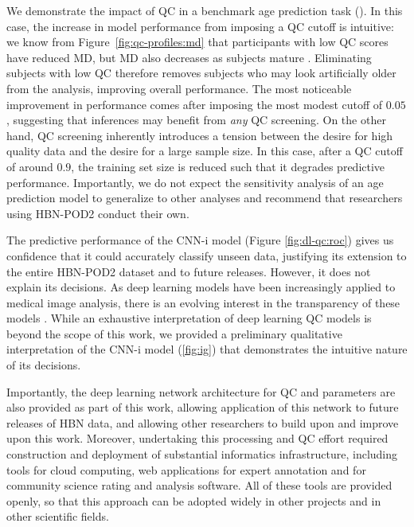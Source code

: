 \documentclass[fleqn,10pt]{wlscirep}
\begin{document}
We demonstrate the impact of QC in a benchmark age prediction task
(\label{fig:age-prediction}). In this case, the increase in model performance
from imposing a QC cutoff is intuitive: we know from
Figure~\ref{fig:qc-profiles:md} that participants with low QC scores have
reduced MD, but MD also decreases as subjects mature
\cite{yeatman2014lifespan,richie-halford2021multidimensional}. Eliminating
subjects with low QC therefore removes subjects who may look artificially older
from the analysis, improving overall performance. The most noticeable
improvement in performance comes after imposing the most modest cutoff of
$0.05$, suggesting that inferences may benefit from \emph{any} QC screening. On
the other hand, QC screening inherently introduces a tension between the desire
for high quality data and the desire for a large sample size. In this case,
after a QC cutoff of around $0.9$, the training set size is reduced such that it
degrades predictive performance. Importantly, we do not expect the sensitivity
analysis of an age prediction model to generalize to other analyses and
recommend that researchers using HBN-POD2 conduct their own.

The predictive performance of the CNN-i model (Figure \ref{fig:dl-qc:roc}) gives
us confidence that it could accurately classify unseen data, justifying its
extension to the entire HBN-POD2 dataset and to future releases. However, it
does not explain its decisions. As deep learning models have been increasingly
applied to medical image analysis, there is an evolving interest in the
transparency of these models \cite{salahuddin2022transparency}. While an
exhaustive interpretation of deep learning QC models is beyond the scope of this
work, we provided a preliminary qualitative interpretation of the CNN-i model
(\ref{fig:ig}) that demonstrates the intuitive nature of its decisions.

Importantly, the deep learning network architecture for QC and parameters are
also provided as part of this work, allowing application of this network to
future releases of HBN data, and allowing other researchers to build upon and
improve upon this work. Moreover, undertaking this processing and QC effort
required construction and deployment of substantial informatics infrastructure,
including tools for cloud computing, web applications for expert annotation and
for community science rating and analysis software. All of these tools are
provided openly, so that this approach can be adopted widely in other projects
and in other scientific fields.
\end{document}
